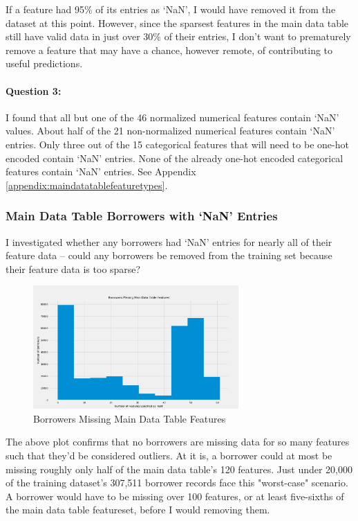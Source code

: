 \documentclass[12pt, letterpaper]{article}
\begin{document}
If a feature had 95\% of its entries as `NaN', I would have removed it from the dataset at this point. However, since the sparsest features in the main data table still have valid data in just over 30\% of their entries, I don't want to prematurely remove a feature that may have a chance, however remote, of contributing to useful predictions.

\paragraph{Question 3:}
I found that all but one of the 46 normalized numerical features contain `NaN' values. About half of the 21 non-normalized numerical features contain `NaN' entries. Only three out of the 15 categorical features that will need to be one-hot encoded contain `NaN' entries. None of the already one-hot encoded categorical features contain `NaN' entries. See Appendix \ref{appendix:maindatatablefeaturetypes}.

\subsubsection{Main Data Table Borrowers with `NaN' Entries}
I investigated whether any borrowers had `NaN' entries for nearly all of their feature data -- could any borrowers be removed from the training set because their feature data is too sparse?

\begin{figure}[ht]
\includegraphics[width=0.7\textwidth]{borrowersnandata}
\centering
\caption{Borrowers Missing Main Data Table Features}
\end{figure}

The above plot confirms that no borrowers are missing data for so many features such that they'd be considered outliers. At it is, a borrower could at most be missing roughly only half of the main data table's 120 features. Just under 20,000 of the training dataset's 307,511 borrower records face this "worst-case" scenario. A borrower would have to be missing over 100 features, or at least five-sixths of the main data table featureset, before I would removing them.
\end{document}
